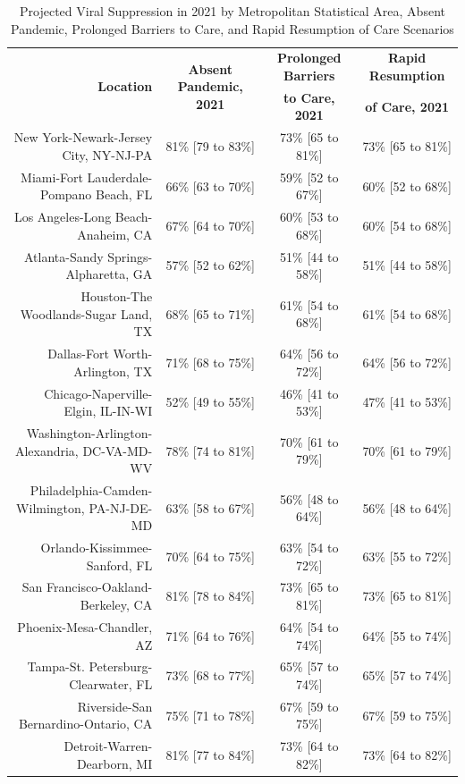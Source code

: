 \documentclass{article}
\begin{document}
\begin{table}[H]
	\caption{Projected Viral Suppression in 2021 by Metropolitan Statistical Area, Absent Pandemic, Prolonged Barriers to Care, and Rapid Resumption of Care Scenarios}
	\footnotesize
	\begin{tabular}{|r|c|c|c|}
		\hline
		\multirow{2}{*}{\textbf{Location}} & \multirow{2}{*}{\textbf{Absent Pandemic, 2021}} & \textbf{Prolonged Barriers} & \textbf{Rapid Resumption}\\
		&  & \textbf{to Care, 2021} & \textbf{of Care, 2021}\\
		\hline\hline
		New York-Newark-Jersey City, NY-NJ-PA & 81\% [79 to 83\%] & 73\% [65 to 81\%] & 73\% [65 to 81\%]\\
		Miami-Fort Lauderdale-Pompano Beach, FL & 66\% [63 to 70\%] & 59\% [52 to 67\%] & 60\% [52 to 68\%]\\
		Los Angeles-Long Beach-Anaheim, CA & 67\% [64 to 70\%] & 60\% [53 to 68\%] & 60\% [54 to 68\%]\\
		Atlanta-Sandy Springs-Alpharetta, GA & 57\% [52 to 62\%] & 51\% [44 to 58\%] & 51\% [44 to 58\%]\\
		Houston-The Woodlands-Sugar Land, TX & 68\% [65 to 71\%] & 61\% [54 to 68\%] & 61\% [54 to 68\%]\\
		Dallas-Fort Worth-Arlington, TX & 71\% [68 to 75\%] & 64\% [56 to 72\%] & 64\% [56 to 72\%]\\
		Chicago-Naperville-Elgin, IL-IN-WI & 52\% [49 to 55\%] & 46\% [41 to 53\%] & 47\% [41 to 53\%]\\
		Washington-Arlington-Alexandria, DC-VA-MD-WV & 78\% [74 to 81\%] & 70\% [61 to 79\%] & 70\% [61 to 79\%]\\
		Philadelphia-Camden-Wilmington, PA-NJ-DE-MD & 63\% [58 to 67\%] & 56\% [48 to 64\%] & 56\% [48 to 64\%]\\
		Orlando-Kissimmee-Sanford, FL & 70\% [64 to 75\%] & 63\% [54 to 72\%] & 63\% [55 to 72\%]\\
		San Francisco-Oakland-Berkeley, CA & 81\% [78 to 84\%] & 73\% [65 to 81\%] & 73\% [65 to 81\%]\\
		Phoenix-Mesa-Chandler, AZ & 71\% [64 to 76\%] & 64\% [54 to 74\%] & 64\% [55 to 74\%]\\
		Tampa-St. Petersburg-Clearwater, FL & 73\% [68 to 77\%] & 65\% [57 to 74\%] & 65\% [57 to 74\%]\\
		Riverside-San Bernardino-Ontario, CA & 75\% [71 to 78\%] & 67\% [59 to 75\%] & 67\% [59 to 75\%]\\
		Detroit-Warren-Dearborn, MI & 81\% [77 to 84\%] & 73\% [64 to 82\%] & 73\% [64 to 82\%]\\

\end{tabular}
\end{table}
\end{document}
